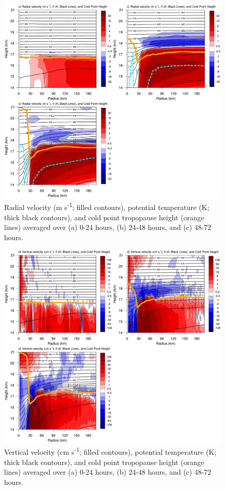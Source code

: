 \documentclass{ametsoc}
\begin{document}
\begin{figure}[ht]
\centerline{\includegraphics[width=39pc]{figures/u.png}}
\caption{Radial velocity (m s\textsuperscript{-1}; filled contours), potential temperature (K; thick black contours), and cold point tropopause height (orange lines) averaged over (a) 0-24 hours, (b) 24-48 hours, and (c) 48-72 hours.}
\label{fig:u}
\end{figure}

\begin{figure}[ht]
\centerline{\includegraphics[width=39pc]{figures/w.png}}
\caption{Vertical velocity (cm s\textsuperscript{-1}; filled contours), potential temperature (K; thick black contours), and cold point tropopause height (orange lines) averaged over (a) 0-24 hours, (b) 24-48 hours, and (c) 48-72 hours.}
\label{fig:w}
\end{figure}
\end{document}
